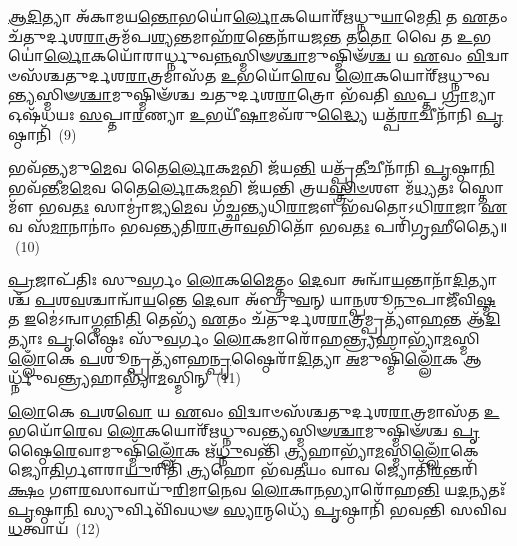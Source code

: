 \-\ul{𑌆}\-\-\ul{𑌦𑌿}\-𑌤𑍍𑌯𑌾 𑌅᳴𑌕𑌾𑌮𑌯\-\ul{𑌨𑍍𑌤𑍋}\-𑌭𑌯𑍋॑\-\ul{𑌰𑍍𑌲𑍋}\-𑌕𑌯𑍋𑌰𑍍᳴𑌋𑌧𑍍𑌨𑍁\-\ul{𑌯𑌾}\-𑌮𑍇\-\ul{𑌤𑌿} 𑌤 \ul{𑌏}\-𑌤𑌂 𑌚᳴𑌤𑍁𑌰𑍍𑌦𑌶\-\ul{𑌰𑌾}\-𑌤𑍍𑌰𑌮᳴𑌪\-\ul{𑌶𑍍𑌯}\-𑌨𑍍𑌤𑌮𑌾𑌹᳴\-\ul{𑌰}\-𑌨𑍍𑌤𑍇𑌨𑌾᳴𑌯𑌜\-\ul{𑌨𑍍𑌤} 𑌤\-\ul{𑌤𑍋} 𑌵𑍈 𑌤 \ul{𑌉}\-𑌭𑌯𑍋॑\-\ul{𑌰𑍍𑌲𑍋}\-𑌕𑌯𑍋᳴𑌰𑌾𑌰𑍍𑌧𑍍𑌨𑍁𑌵\-\ul{𑌨𑍍𑌨}\-𑌸𑍍𑌮𑌿𑍟\-\ul{𑌶𑍍𑌚𑌾}\-𑌮𑍁𑌷𑍍𑌮𑌿𑍟᳴\-\ul{𑌶𑍍𑌚} 𑌯 \ul{𑌏}\-𑌵𑌂 \ul{𑌵𑌿}\-𑌦𑍍𑌵𑌾𑍞𑌸᳴𑌶𑍍𑌚𑌤𑍁𑌰𑍍𑌦𑌶\-\ul{𑌰𑌾}\-𑌤𑍍𑌰𑌮𑌾𑌸᳴𑌤 \ul{𑌉}\-𑌭𑌯𑍋᳴\-\ul{𑌰𑍇}\-𑌵 \ul{𑌲𑍋}\-𑌕𑌯𑍋𑌰𑍍\mbox{}᳴𑌋𑌧𑍍𑌨𑍁𑌵\-\ul{𑌨𑍍𑌤𑍍𑌯}\-\-𑌸𑍍𑌮𑌿𑍟\-\ul{𑌶𑍍𑌚𑌾}\-𑌮𑍁𑌷𑍍𑌮𑌿𑍟᳴𑌶𑍍𑌚 𑌚𑌤𑍁𑌰𑍍𑌦𑌶\-\ul{𑌰𑌾}\-𑌤𑍍𑌰𑍋 𑌭᳴𑌵𑌤𑌿 \ul{𑌸}\-𑌪𑍍𑌤 \ul{𑌗𑍍𑌰𑌾}\-𑌮𑍍𑌯𑌾 𑌓𑌷᳴𑌧𑌯𑌃 \ul{𑌸}\-𑌪𑍍𑌤𑌾\-\ul{𑌰}\-𑌣𑍍𑌯𑌾 \ul{𑌉}\-𑌭𑌯𑍀᳴\-\ul{𑌷𑌾}\-𑌮𑌵᳴𑌰𑍁\-\ul{𑌦𑍍𑌧𑍍𑌯𑍈} 𑌯𑌤𑍍𑌪᳴\-\ul{𑌰𑌾}\-𑌚𑍀𑌨𑌾᳴𑌨𑌿 \ul{𑌪𑍃}\-𑌷𑍍𑌠𑌾𑌨𑌿᳴~(9)

𑌭𑌵᳴\-\ul{𑌨𑍍𑌤𑍍𑌯}\-𑌮𑍁\-\ul{𑌮𑍇}\-𑌵 𑌤𑍈\-\ul{𑌰𑍍𑌲𑍋}\-𑌕\-\ul{𑌮}\-𑌭𑌿 𑌜᳴𑌯\-\ul{𑌨𑍍𑌤𑌿} 𑌯𑌤𑍍𑌪𑍍𑌰᳴\-\ul{𑌤𑍀}\-𑌚𑍀𑌨𑌾᳴𑌨𑌿 \ul{𑌪𑍃}\-𑌷𑍍𑌠𑌾\-\ul{𑌨𑌿} 𑌭𑌵᳴\-\ul{𑌨𑍍𑌤𑍀}\-𑌮\-\ul{𑌮𑍇}\-𑌵 𑌤𑍈\-\ul{𑌰𑍍𑌲𑍋}\-𑌕\-\ul{𑌮}\-𑌭𑌿 𑌜᳴𑌯𑌨𑍍𑌤𑌿 𑌤𑍍𑌰𑌯\-\ul{𑌸𑍍𑌤𑍍𑌰𑌿}\-\-\ul{𑍞}\-𑌶𑍗 𑌮᳴\-\ul{𑌧𑍍𑌯}\-𑌤𑌃 𑌸𑍍𑌤𑍋𑌮𑍗᳴ 𑌭𑌵\-\ul{𑌤𑌃} 𑌸𑌾𑌮𑍍𑌰𑌾॑𑌜𑍍𑌯\-\ul{𑌮𑍇}\-𑌵 𑌗᳴𑌚𑍍𑌛𑌨𑍍𑌤𑍍𑌯𑌧𑌿\-\ul{𑌰𑌾}\-𑌜𑍗 𑌭᳴𑌵𑌤𑍋\-𑌽𑌧𑌿\-\ul{𑌰𑌾}\-𑌜𑌾 \ul{𑌏}\-𑌵 𑌸᳴\-\ul{𑌮𑌾}\-𑌨𑌾𑌨𑌾𑌂॑ 𑌭𑌵𑌨𑍍𑌤𑍍𑌯𑌤𑌿\-\ul{𑌰𑌾}\-𑌤𑍍𑌰𑌾\-\ul{𑌵}\-𑌭𑌿𑌤𑍋᳴ 𑌭𑌵\-\ul{𑌤𑌃} 𑌪𑌰𑌿᳴𑌗𑍃𑌹𑍀𑌤𑍍𑌯𑍈॥~(10)

{\anuvakamend[{\-\ul{𑌪𑍃}\-𑌷𑍍𑌠𑌾\-\ul{𑌨𑌿} 𑌚𑌤𑍁᳴𑌸𑍍𑌤𑍍𑌰𑌿𑍞𑌶𑌚𑍍𑌚}]}%

\-\ul{𑌪𑍍𑌰}\-𑌜𑌾𑌪᳴𑌤𑌿𑌃 𑌸𑍁\-\ul{𑌵}\-𑌰𑍍𑌗𑌂 \ul{𑌲𑍋}\-𑌕\-\ul{𑌮𑍈}\-𑌤𑍍𑌤𑌂 \ul{𑌦𑍇}\-𑌵𑌾 𑌅𑌨𑍍𑌵𑌾᳴\-\ul{𑌯}\-𑌨𑍍𑌤𑌾𑌨𑌾᳴\-\ul{𑌦𑌿}\-𑌤𑍍𑌯𑌾𑌶𑍍𑌚᳴ \ul{𑌪}\-𑌶\-\ul{𑌵}\-𑌶𑍍𑌚𑌾𑌨𑍍𑌵𑌾᳴\-\ul{𑌯}\-𑌨𑍍𑌤𑍇 \ul{𑌦𑍇}\-𑌵𑌾 𑌅᳴𑌬𑍍𑌰𑍁\-\ul{𑌵}\-𑌨𑍍 𑌯𑌾\-\ul{𑌨𑍍𑌪}\-𑌶𑍂\-\ul{𑌨𑍁}\-𑌪𑌾𑌜𑍀᳴𑌵𑌿\-\ul{𑌷𑍍𑌮} 𑌤 \ul{𑌇}\-𑌮𑍇॑\-𑌽𑌨𑍍𑌵𑌾\-\ul{𑌗𑍍𑌮}\-𑌨𑍍𑌨𑌿\-\ul{𑌤𑌿} 𑌤𑍇𑌭𑍍𑌯᳴ \ul{𑌏}\-𑌤𑌂 𑌚᳴𑌤𑍁𑌰𑍍𑌦𑌶\-\ul{𑌰𑌾}\-𑌤𑍍𑌰𑌮𑍍𑌪𑍍𑌰𑌤𑍍𑌯𑍗᳴\-\ul{𑌹}\-𑌨𑍍𑌤 𑌆᳴\-\ul{𑌦𑌿}\-𑌤𑍍𑌯𑌾𑌃 \ul{𑌪𑍃}\-𑌷𑍍𑌠𑍈𑌃 𑌸𑍁᳴\-\ul{𑌵}\-𑌰𑍍𑌗𑌂 \ul{𑌲𑍋}\-𑌕𑌮𑌾𑌰𑍋᳴𑌹\-\ul{𑌨𑍍𑌤𑍍𑌰𑍍𑌯}\-𑌹𑌾𑌭𑍍𑌯𑌾᳴\-\ul{𑌮}\-𑌸𑍍𑌮𑌿\-\ul{𑌲𑍍𑌲𑍋𑌁}\-𑌕𑍇 \ul{𑌪}\-𑌶𑍂𑌨𑍍𑌪𑍍𑌰𑌤𑍍𑌯𑍗᳴𑌹\-\ul{𑌨𑍍𑌪𑍃}\-𑌷𑍍𑌠𑍈𑌰𑌾᳴\-\ul{𑌦𑌿}\-𑌤𑍍𑌯𑌾 \ul{𑌅}\-𑌮𑍁𑌷𑍍𑌮𑌿᳴\-\ul{𑌲𑍍𑌲𑍋𑌁}\-𑌕 𑌆𑌰𑍍𑌧𑍍𑌨𑍁᳴𑌵\-\ul{𑌨𑍍𑌤𑍍𑌰𑍍𑌯}\-𑌹𑌾𑌭𑍍𑌯𑌾᳴\-\ul{𑌮}\-𑌸𑍍𑌮𑌿𑌨𑍍~(11)

\-\ul{𑌲𑍋}\-𑌕𑍇 \ul{𑌪}\-𑌶\-\ul{𑌵𑍋} 𑌯 \ul{𑌏}\-𑌵𑌂 \ul{𑌵𑌿}\-𑌦𑍍𑌵𑌾𑍞𑌸᳴𑌶𑍍𑌚𑌤𑍁𑌰𑍍𑌦𑌶\-\ul{𑌰𑌾}\-𑌤𑍍𑌰𑌮𑌾𑌸᳴𑌤 \ul{𑌉}\-𑌭𑌯𑍋᳴\-\ul{𑌰𑍇}\-𑌵 \ul{𑌲𑍋}\-𑌕𑌯𑍋𑌰𑍍᳴𑌋𑌧𑍍𑌨𑍁𑌵\-\ul{𑌨𑍍𑌤𑍍𑌯}\-𑌸𑍍𑌮𑌿𑍟\-\ul{𑌶𑍍𑌚𑌾}\-𑌮𑍁𑌷𑍍𑌮𑌿𑍟᳴𑌶𑍍𑌚 \ul{𑌪𑍃}\-𑌷𑍍𑌠𑍈\-\ul{𑌰𑍇}\-𑌵𑌾𑌮𑍁𑌷𑍍𑌮𑌿᳴\-\ul{𑌲𑍍𑌲𑍋𑌁}\-𑌕 𑌋᳴\-\ul{𑌧𑍍𑌨𑍁}\-𑌵𑌨𑍍𑌤𑌿᳴ \ul{𑌤𑍍𑌰𑍍𑌯}\-𑌹𑌾𑌭𑍍𑌯𑌾᳴\-\ul{𑌮}\-𑌸𑍍𑌮𑌿\-\ul{𑌲𑍍𑌲𑍋𑌁}\-𑌕𑍇 𑌜𑍍𑌯𑍋\-\ul{𑌤𑌿}\-𑌰𑍍𑌗𑍗𑌰𑌾\-\ul{𑌯𑍁}\-𑌰𑌿𑌤𑌿᳴ \ul{𑌤𑍍𑌰𑍍𑌯}\-𑌹𑍋 𑌭᳴𑌵\-\ul{𑌤𑍀}\-𑌯𑌂 𑌵𑌾𑌵 𑌜𑍍𑌯𑍋𑌤𑌿᳴\-\ul{𑌰}\-𑌨𑍍𑌤𑌰𑌿᳴\-\ul{𑌕𑍍𑌷𑌂} 𑌗𑍗\-\ul{𑌰}\-𑌸𑌾𑌵𑌾𑌯𑍁᳴\-\ul{𑌰𑌿}\-𑌮𑌾\-\ul{𑌨𑍇}\-𑌵 \ul{𑌲𑍋}\-𑌕𑌾\-\ul{𑌨}\-𑌭𑍍𑌯𑌾𑌰𑍋᳴𑌹\-\ul{𑌨𑍍𑌤𑌿} 𑌯\-\ul{𑌦}\-𑌨𑍍𑌯𑌤𑌃᳴ \ul{𑌪𑍃}\-𑌷𑍍𑌠𑌾\-\ul{𑌨𑌿} 𑌸𑍍𑌯𑍁𑌰𑍍𑌵𑌿𑌵𑌿᳴𑌵𑌧𑍟 \ul{𑌸𑍍𑌯𑌾}\-𑌨𑍍𑌮𑌧𑍍𑌯𑍇᳴ \ul{𑌪𑍃}\-𑌷𑍍𑌠𑌾𑌨𑌿᳴ 𑌭𑌵𑌨𑍍𑌤𑌿 𑌸𑌵𑌿𑌵\-\ul{𑌧}\-𑌤𑍍𑌵𑌾𑌯᳴~(12)

